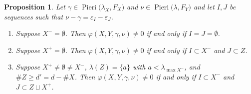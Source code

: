 \documentclass[11pt,fleqn]{amsart}
\renewcommand\phi{\varphi}
\renewcommand\epsilon{\varepsilon}
\newtheorem{prop}[thm]{Proposition}
\theoremstyle{definition}
\theoremstyle{remark}
\theoremstyle{remark}
\newcommand\Pieri[2]{\operatorname{Pieri}{(#1},{#2)}}
\newcommand\map[4]{\phi(#3,#4,#1,#2)}
\begin{document}
\begin{prop}
\label{prop:nonzero-sufficient-dual}
Let $\gamma \in \Pieri{\lambda_X}{F_X}$ and $\nu \in \Pieri{\lambda}{F_Y}$ and 
let $I, J$ be sequences such that $\nu - \gamma = \epsilon_I - \epsilon_J$. 
\begin{enumerate}
  \item Suppose $X^- = \emptyset$. Then $\map{\gamma}{\nu}{X}{Y} \neq 0$ if and 
    only if $I = J = \emptyset$.
  \item Suppose $X^+ = \emptyset$. Then $\map{\gamma}{\nu}{X}{Y} \neq 0$ if and 
    only if $I \subset X^-$ and $J \subset Z$.
  \item Suppose $X^+ \neq \emptyset \neq X^-$, $\lambda(Z) = \{a\}$ 
    with $a < \lambda_{\max X^-}$, and $\#Z \geq d' = d - \#X$. Then 
    $\map{\gamma}{\nu}{X}{Y} \neq 0$ if and only if $I \subset X^-$ 
    and $J \subset Z \sqcup X^+$. 
\end{enumerate}
\end{prop}
\end{document}
